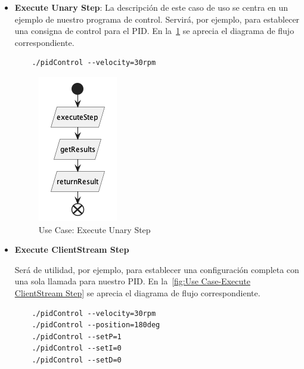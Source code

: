 \begin{itemize}
    \item \textbf{Execute Unary Step}: La descripción de este caso de uso se centra en un ejemplo de nuestro programa de control.
    Servirá, por ejemplo, para establecer una consigna de control para el PID\@.
    En la~\cref{fig:Use Case-Execute Unary Step} se aprecia el diagrama de flujo correspondiente.

    \begin{verbatim}
    ./pidControl --velocity=30rpm
    \end{verbatim}

    \begin{figure}[H]
        \centering
        \includegraphics[height=0.25\textheight]{./part/Proyecto_ejecutivo/memoria_descriptiva/descripcionDelProyecto/client/uml/executeUnaryStep}
        \caption{Use Case: Execute Unary Step}\label{fig:Use Case-Execute Unary Step}
    \end{figure}

    \item \textbf{Execute ClientStream Step}

    Será de utilidad, por ejemplo, para establecer una configuración completa con una sola llamada para nuestro PID\@.
    En la~\cref{fig:Use Case-Execute ClientStream Step} se aprecia el diagrama de flujo correspondiente.
    \begin{verbatim}
    ./pidControl --velocity=30rpm
    ./pidControl --position=180deg
    ./pidControl --setP=1
    ./pidControl --setI=0
    ./pidControl --setD=0
    \end{verbatim}


\end{itemize}
